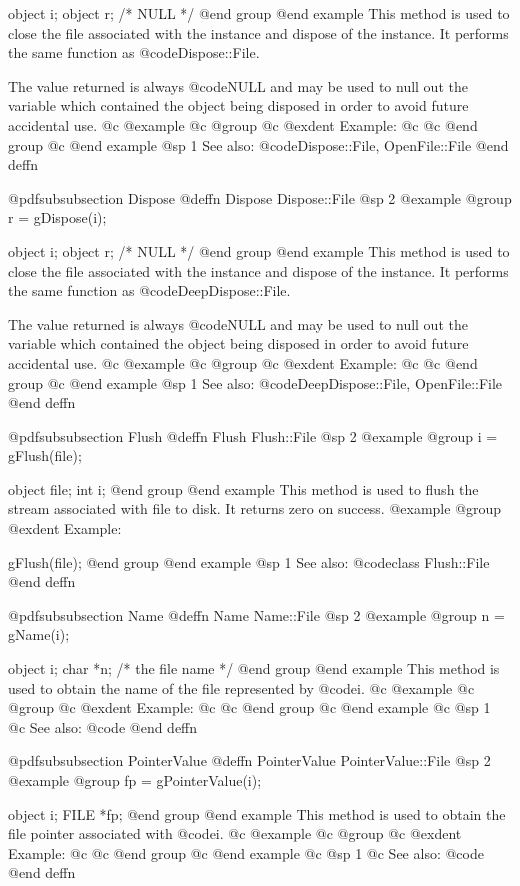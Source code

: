 object  i;
object  r;     /*  NULL  */
@end group
@end example
This method is used to close the file associated with the instance and
dispose of the instance.  It performs the same function as
@code{Dispose::File}.  

The value returned is always @code{NULL} and may be used to null out
the variable which contained the object being disposed in order to
avoid future accidental use.
@c @example
@c @group
@c @exdent Example:
@c 
@c @end group
@c @end example
@sp 1
See also:  @code{Dispose::File, OpenFile::File}
@end deffn











@pdfsubsubsection {Dispose}
@deffn {Dispose} Dispose::File
@sp 2
@example
@group
r = gDispose(i);

object  i;
object  r;     /*  NULL  */
@end group
@end example
This method is used to close the file associated with the instance and
dispose of the instance.  It performs the same function as
@code{DeepDispose::File}.  

The value returned is always @code{NULL} and may be used to null out
the variable which contained the object being disposed in order to
avoid future accidental use.
@c @example
@c @group
@c @exdent Example:
@c 
@c @end group
@c @end example
@sp 1
See also:  @code{DeepDispose::File, OpenFile::File}
@end deffn






@pdfsubsubsection {Flush}
@deffn {Flush} Flush::File
@sp 2
@example
@group
i = gFlush(file);

object file;
int  i;
@end group
@end example
This method is used to flush the stream associated with
file to disk.  It returns zero on success.
@example
@group
@exdent Example:

gFlush(file);
@end group
@end example
@sp 1
See also:  @code{class Flush::File}
@end deffn










@pdfsubsubsection {Name}
@deffn {Name} Name::File
@sp 2
@example
@group
n = gName(i);

object  i;
char    *n;  /*  the file name  */
@end group
@end example
This method is used to obtain the name of the file represented by @code{i}.
@c @example
@c @group
@c @exdent Example:
@c 
@c @end group
@c @end example
@c @sp 1
@c See also:  @code{}
@end deffn







@pdfsubsubsection {PointerValue}
@deffn {PointerValue} PointerValue::File
@sp 2
@example
@group
fp = gPointerValue(i);

object  i;
FILE    *fp;
@end group
@end example
This method is used to obtain the file pointer associated with @code{i}.
@c @example
@c @group
@c @exdent Example:
@c 
@c @end group
@c @end example
@c @sp 1
@c See also:  @code{}
@end deffn





